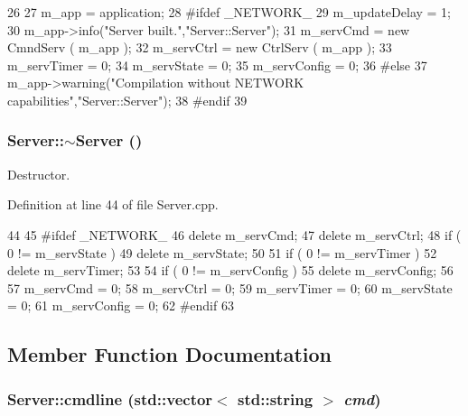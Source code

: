 \begin{DoxyCode}
26                                          {
27   m_app = application;
28 #ifdef _NETWORK_
29   m_updateDelay = 1;
30   m_app->info("Server built.","Server::Server");
31   m_servCmd    = new CmndServ ( m_app );
32   m_servCtrl   = new CtrlServ ( m_app );
33   m_servTimer  = 0;
34   m_servState  = 0;
35   m_servConfig = 0;
36 #else
37   m_app->warning("Compilation without NETWORK capabilities","Server::Server"); 
38 #endif  
39 }
\end{DoxyCode}
\hypertarget{classServer_a4b3aa2579cb1c8cd1d069582c14d0fa6}{
\subsubsection[{$\sim$Server}]{\setlength{\rightskip}{0pt plus 5cm}Server::$\sim$Server ()}}
\label{classServer_a4b3aa2579cb1c8cd1d069582c14d0fa6}


Destructor. 

Definition at line 44 of file Server.cpp.


\begin{DoxyCode}
44                 {
45 #ifdef _NETWORK_
46   delete m_servCmd;
47   delete m_servCtrl;
48   if ( 0 != m_servState ) {
49     delete m_servState;
50   }
51   if ( 0 != m_servTimer ) {
52     delete m_servTimer;
53   }
54   if ( 0 != m_servConfig ) {
55     delete m_servConfig;
56   }
57   m_servCmd    = 0;
58   m_servCtrl   = 0;
59   m_servTimer  = 0;
60   m_servState  = 0;
61   m_servConfig = 0;
62 #endif
63 }
\end{DoxyCode}


\subsection{Member Function Documentation}
\hypertarget{classServer_adc7d38a333b12fbe03db3d209f5feae9}{
\subsubsection[{cmdline}]{ Server::cmdline (std::vector$<$ std::string $>$ {\em cmd})}}
\label{classServer_adc7d38a333b12fbe03db3d209f5feae9}


